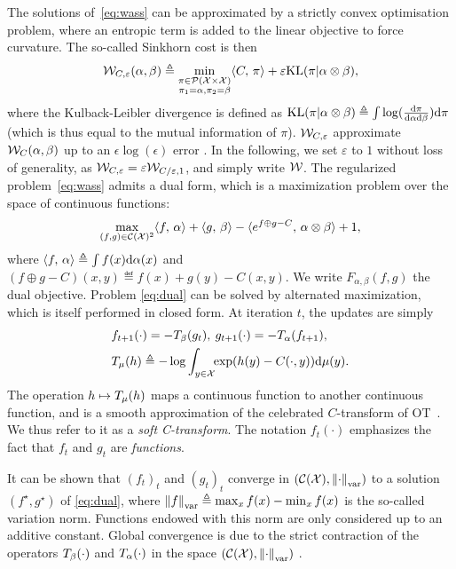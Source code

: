 The solutions of~\eqref{eq:wass} can be approximated by a strictly convex optimisation problem, where an entropic term is added to the linear objective to force curvature. The so-called Sinkhorn cost is then
\begin{equation}\label{eq:wass}
    \mathcal{W}_{C,\varepsilon}(\alpha, \beta) \triangleq 
    \min_{
    \substack{
        \pi \in \mathcal{P}(\mathcal{X} \times \mathcal{X})
        \\\pi_1 = \alpha, \pi_2 = \beta
    }    
    } \langle C,\,\pi\rangle + \varepsilon \textrm{KL}(\pi | \alpha \otimes \beta),
\end{equation}
where the Kulback-Leibler divergence is defined as $\textrm{KL}(\pi | \alpha \otimes
\beta) \triangleq \int \log(\frac{\textrm{d}\pi}{\textrm{d}\alpha\textrm{d}\beta}) \textrm{d}\pi$ (which is thus equal to
the mutual information of $\pi$).
%
$\mathcal{W}_{C,\varepsilon}$ approximate $\mathcal{W}_C(\alpha,\beta)$ up to an $\epsilon
\log(\epsilon)$ error \citep{2019-Genevay-aistats}. In the following, we set
$\varepsilon$ to $1$ without loss of generality, as $\mathcal{W}_{C, \varepsilon} =
\varepsilon \mathcal{W}_{C / \varepsilon, 1}$, and simply write $\mathcal{W}$.
%
The regularized problem~\eqref{eq:wass} admits a dual form, which is a maximization problem over the space of continuous functions:
\begin{equation}\label{eq:dual}
    \max_{(f, g) \in \mathcal{C}(\mathcal{X})^2} \langle f,\,\alpha\rangle + 
    \langle g,\,\beta\rangle
    - \langle e^{f \oplus g - C},\,\alpha \otimes \beta\rangle + 1, 
\end{equation}
where $\langle f,\,\alpha\rangle \triangleq \int f(x) \textrm{d}\alpha(x)$ and $(f \oplus g - C)(x,y)
\eqdef f(x)+g(y)-C(x,y)$. We write $F_{\alpha, \beta}(f, g)$ the dual objective. 
Problem \eqref{eq:dual} can be solved by alternated maximization, which is itself performed in closed form. At iteration $t$, the updates are simply
\begin{align}
    &f_{t+1}(\cdot) = - T_{\beta}(g_t), \:
    g_{t+1}(\cdot) = - T_{\alpha}(f_{t+1}), \\
    &
    T_{\mu}(h) \triangleq 
    - \log \int_{y \in \mathcal{X}}\!\! \exp(h(y) - C(\cdot, y))\textrm{d} \mu(y).\label{eq:sinkhorn}
\end{align}
The operation $h \mapsto T_{\mu}(h)$  maps a continuous function to another
continuous function, and is a smooth approximation of the celebrated
$C$-transform of OT~\citep{santambrogio2015optimal}. We thus refer to it as a
\textit{soft C-transform}. 
%
The notation $f_t(\cdot)$ emphasizes the fact that $f_t$ and $g_t$ are
\textit{functions}. 
%

It can be shown that ${(f_t)}_t$ and ${(g_t)}_t$ converge in $(\mathcal{C}(\mathcal{X}),
\left\| \cdot \right\|_{\text{var}})$ to a solution $(f^\star, g^\star)$ of
\eqref{eq:dual}, where $\left\| f \right\|_{\text{var}} \triangleq \max_x f(x) - \min_x f(x)$
is the so-called variation norm. Functions endowed with this norm are only
considered up to an additive constant.  Global convergence is due to the strict
contraction of the operators $T_{\beta}(\cdot)$ and
$T_{\alpha}(\cdot)$ in the space $(\mathcal{C}(\mathcal{X}), \left\| \cdot \right\|_{\text{var}})$
\citep{lemmens_nonlinear_2012}.

